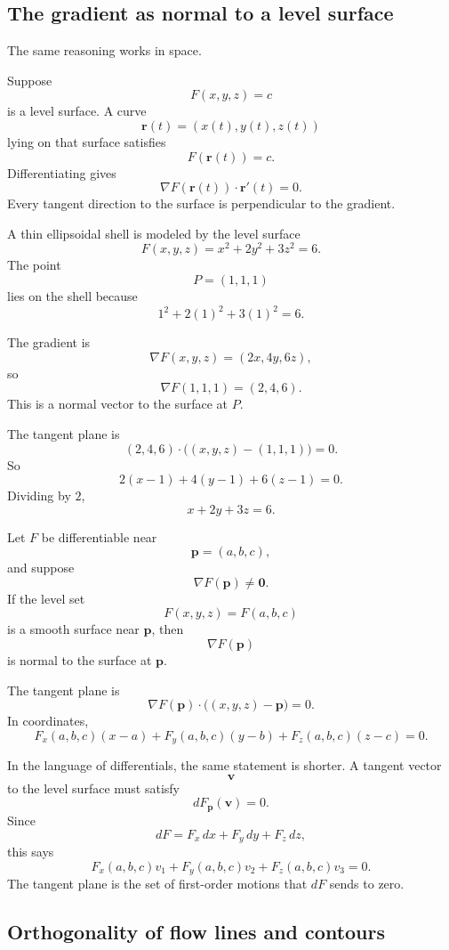 \subsection{The gradient as normal to a level surface}

The same reasoning works in space.

Suppose
\[
    F(x,y,z)=c
\]
is a level surface.  A curve
\[
    \mathbf r(t)=(x(t),y(t),z(t))
\]
lying on that surface satisfies
\[
    F(\mathbf r(t))=c.
\]
Differentiating gives
\[
    \nabla F(\mathbf r(t))\cdot \mathbf r'(t)=0.
\]
Every tangent direction to the surface is perpendicular to the gradient.

\begin{example}
A thin ellipsoidal shell is modeled by the level surface
\[
    F(x,y,z)=x^2+2y^2+3z^2=6.
\]
The point
\[
    P=(1,1,1)
\]
lies on the shell because
\[
    1^2+2(1)^2+3(1)^2=6.
\]

The gradient is
\[
    \nabla F(x,y,z)=(2x,4y,6z),
\]
so
\[
    \nabla F(1,1,1)=(2,4,6).
\]
This is a normal vector to the surface at \(P\).

The tangent plane is
\[
    (2,4,6)\cdot\bigl((x,y,z)-(1,1,1)\bigr)=0.
\]
So
\[
    2(x-1)+4(y-1)+6(z-1)=0.
\]
Dividing by \(2\),
\[
\boxed{
    x+2y+3z=6.
}
\]
\end{example}

\begin{theorem}
Let \(F\) be differentiable near
\[
    \mathbf p=(a,b,c),
\]
and suppose
\[
    \nabla F(\mathbf p)\ne\mathbf 0.
\]
If the level set
\[
    F(x,y,z)=F(a,b,c)
\]
is a smooth surface near \(\mathbf p\), then
\[
\boxed{
    \nabla F(\mathbf p)
}
\]
is normal to the surface at \(\mathbf p\).

The tangent plane is
\[
\boxed{
    \nabla F(\mathbf p)\cdot \bigl((x,y,z)-\mathbf p\bigr)=0.
}
\]
In coordinates,
\[
\boxed{
    F_x(a,b,c)(x-a)+F_y(a,b,c)(y-b)+F_z(a,b,c)(z-c)=0.
}
\]
\end{theorem}

In the language of differentials, the same statement is shorter.  A tangent vector
\[
    \mathbf v
\]
to the level surface must satisfy
\[
\boxed{
    dF_{\mathbf p}(\mathbf v)=0.
}
\]
Since
\[
    dF=F_x\,dx+F_y\,dy+F_z\,dz,
\]
this says
\[
    F_x(a,b,c)v_1+F_y(a,b,c)v_2+F_z(a,b,c)v_3=0.
\]
The tangent plane is the set of first-order motions that \(dF\) sends to zero.

\subsection{Orthogonality of flow lines and contours}

